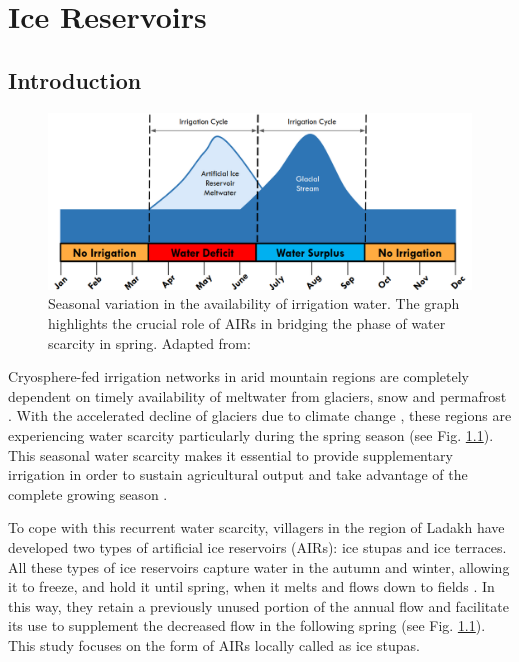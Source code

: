 \chapter{Ice Reservoirs}

\section{Introduction}

\begin{figure}[t]
\centering
\includegraphics[width=12cm]{Figures/irrigation_cycles.png}

\caption{Seasonal variation in the availability of irrigation water. The graph highlights the crucial role of
AIRs in bridging the phase of water scarcity in spring. Adapted from: \cite{nusserLocalKnowledgeGlobal2016}}

\label{fig:irrigation_cycles}
\end{figure}

Cryosphere-fed irrigation networks in arid mountain regions are completely dependent on timely availability of
meltwater from glaciers, snow and permafrost \citep{immerzeelImportanceVulnerabilityWorld2020,
farhanHydrologicalRegimesConjunction2015, tveitenGlacierGrowingLocal2007}. With the accelerated decline of
glaciers due to climate change \citep{nusserLocalKnowledgeGlobal2016}, these regions are experiencing water
scarcity particularly during the spring season \citep{norphelSnowWaterHarvesting2015,
mukhopadhyayReevaluationSnowmeltGlacial2015} (see Fig. \ref{fig:irrigation_cycles}). This seasonal water
scarcity makes it essential to provide supplementary irrigation in order to sustain agricultural output and take
advantage of the complete growing season \citep{nusserLocalKnowledgeGlobal2016, vincentEnergyClimateChange2009}.

To cope with this recurrent water scarcity, villagers in the region of Ladakh have developed two types of
artificial ice reservoirs (AIRs): ice stupas and ice terraces.  All these types of ice reservoirs capture water
in the autumn and winter, allowing it to freeze, and hold it until spring, when it melts and flows down to
fields \citep{ipccChapterHighMountain2019, vinceGlacierMan2009, clouseLadakhArtificialGlaciers2017,
nusserSociohydrologyArtificialGlaciers2019}. In this way, they retain a previously unused portion of the annual
flow and facilitate its use to supplement the decreased flow in the following spring (see Fig.
\ref{fig:irrigation_cycles}). This study focuses on the form of AIRs locally called as ice stupas.


